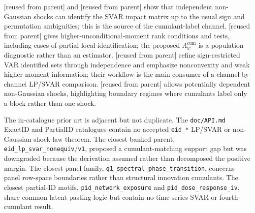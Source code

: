 \documentclass[11pt]{article}
\theoremstyle{definition}
\theoremstyle{plain}
\theoremstyle{remark}
\begin{document}
\citet{GourierouxMonfortRenne2017} [reused from parent] and \citet{LanneMeitzSaikkonen2017} [reused from parent] show that independent non-Gaussian shocks can identify the SVAR impact matrix up to the usual sign and permutation ambiguities; this is the source of the cumulant-label channel.  \citet{Guay2021} [reused from parent] gives higher-unconditional-moment rank conditions and tests, including cases of partial local identification; the proposed \(\Lambda_w^{\mathrm{cum}}\) is a population diagnostic rather than an estimator.  \citet{DrautzburgWright2023} [reused from parent] refine sign-restricted VAR identified sets through independence and emphasize nonconvexity and weak higher-moment information; their workflow is the main consumer of a channel-by-channel LP/SVAR comparison.  \citet{LanneLiuLuoto2026} [reused from parent] allows potentially dependent non-Gaussian shocks, highlighting boundary regimes where cumulants label only a block rather than one shock.

The in-catalogue prior art is adjacent but not duplicate.  The \texttt{doc/API.md} ExactID and PartialID catalogues contain no accepted \texttt{eid\_*} LP/SVAR or non-Gaussian shock-law theorem.  The closest banked parent, \texttt{eid\_lp\_svar\_nonequiv}/\texttt{v1}, proposed a cumulant-matching support gap but was downgraded because the derivation assumed rather than decomposed the positive margin.  The closest panel family, \texttt{q1\_spectral\_phase\_transition}, concerns panel row-space boundaries rather than structural innovation cumulants.  The closest partial-ID motifs, \texttt{pid\_network\_exposure} and \texttt{pid\_dose\_response\_iv}, share common-latent pasting logic but contain no time-series SVAR or fourth-cumulant result.
\end{document}
